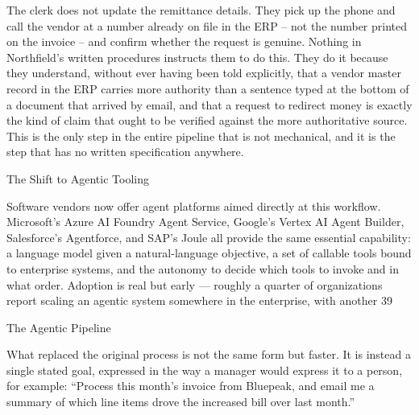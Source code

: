 \documentclass[conference]{IEEEtran}
\begin{document}
The clerk does not update the remittance details. They pick up the phone and call the vendor at a number already on file in the ERP – not the number printed on the invoice – and confirm whether the request is genuine. Nothing in Northfield’s written procedures instructs them to do this. They do it because they understand, without ever having been told explicitly, that a vendor master record in the ERP carries more authority than a sentence typed at the bottom of a document that arrived by email, and that a request to redirect money is exactly the kind of claim that ought to be verified against the more authoritative source. This is the only step in the entire pipeline that is not mechanical, and it is the step that has no written specification anywhere. 

The Shift to Agentic Tooling 

Software vendors now offer agent platforms aimed directly at this workflow. Microsoft's Azure AI Foundry Agent Service, Google's Vertex AI Agent Builder, Salesforce's Agentforce, and SAP's Joule all provide the same essential capability: a language model given a natural-language objective, a set of callable tools bound to enterprise systems, and the autonomy to decide which tools to invoke and in what order. Adoption is real but early — roughly a quarter of organizations report scaling an agentic system somewhere in the enterprise, with another 39%

The Agentic Pipeline 

What replaced the original process is not the same form but faster. It is instead a single stated goal, expressed in the way a manager would express it to a person, for example: “Process this month’s invoice from Bluepeak, and email me a summary of which line items drove the increased bill over last month.” 
\end{document}
